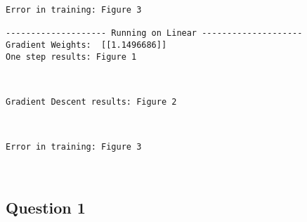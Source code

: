 \documentclass[11pt]{article}
\begin{document}
    \begin{Verbatim}[commandchars=\\\{\}]
Error in training: Figure 3

-------------------- Running on Linear --------------------
Gradient Weights:  [[1.1496686]]
One step results: Figure 1

    \end{Verbatim}

    \begin{center}
    \end{center}
    { \hspace*{\fill} \\}
    
    \begin{Verbatim}[commandchars=\\\{\}]
Gradient Descent results: Figure 2

    \end{Verbatim}

    \begin{center}
    \end{center}
    { \hspace*{\fill} \\}
    
    \begin{Verbatim}[commandchars=\\\{\}]
Error in training: Figure 3

    \end{Verbatim}

    \begin{center}
    \end{center}
    { \hspace*{\fill} \\}
    
    \subsection{Question 1}\label{question-1}
\end{document}
